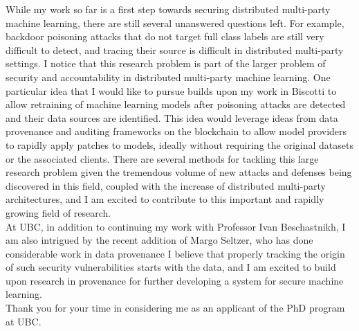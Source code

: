 \documentclass[10pt]{article} %
\begin{document}
While my work so far is a first step towards securing distributed multi-party machine learning, there are still several unanswered questions left. For example, backdoor poisoning attacks that do not target full class labels are still very difficult to detect, and tracing their source is difficult in distributed multi-party settings. I notice that this research problem is part of the larger problem of security and accountability in distributed multi-party machine learning. One particular idea that I would like to pursue builds upon my work in Biscotti to allow retraining of machine learning models after poisoning attacks are detected and their data sources are identified. This idea would leverage ideas from data provenance and auditing frameworks on the blockchain to allow model providers to rapidly apply patches to models, ideally without requiring the original datasets or the associated clients. There are several methods for tackling this large research problem given the tremendous volume of new attacks and defenses being discovered in this field, coupled with the increase of distributed multi-party architectures, and I am excited to contribute to this important and rapidly growing field of research. \\

At UBC, in addition to continuing my work with Professor Ivan Beschastnikh, I am also intrigued by the recent addition of Margo Seltzer, who has done considerable work in data provenance I believe that properly tracking the origin of such security vulnerabilities starts with the data, and I am excited to build upon research in provenance for further developing a system for secure machine learning. \\

Thank you for your time in considering me as an applicant of the PhD program at UBC.
\end{document}
